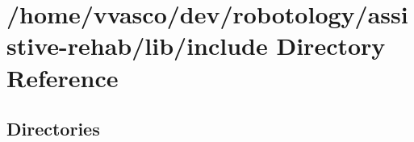 \section{/home/vvasco/dev/robotology/assistive-\/rehab/lib/include Directory Reference}
\label{dir_5a30104352ef4255dc24354b02eb2d20}
\subsection*{Directories}
\begin{DoxyCompactItemize}
\end{DoxyCompactItemize}
